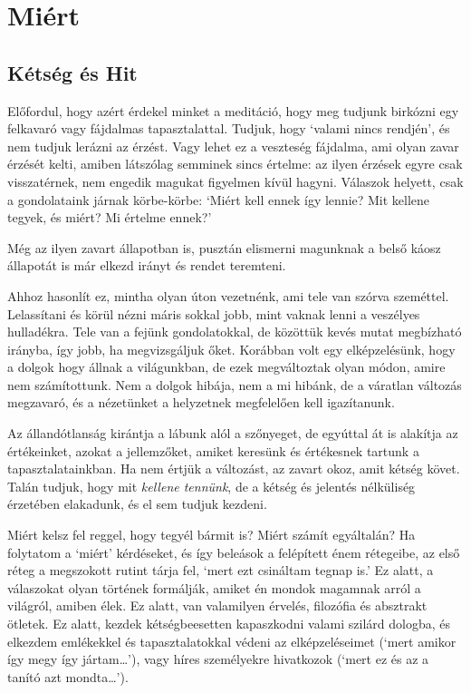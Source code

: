 \chapter{Miért}

\section{Kétség és Hit}


\noindent Előfordul, hogy azért érdekel minket a meditáció, hogy meg
tudjunk birkózni egy felkavaró vagy fájdalmas tapasztalattal. Tudjuk,
hogy `valami nincs rendjén', és nem tudjuk lerázni az érzést. Vagy lehet
ez a veszteség fájdalma, ami olyan zavar érzését kelti, amiben látszólag
semminek sincs értelme: az ilyen érzések egyre csak visszatérnek, nem
engedik magukat figyelmen kívül hagyni. Válaszok helyett, csak a
gondolataink járnak körbe-körbe: `Miért kell ennek így lennie? Mit
kellene tegyek, és miért? Mi értelme ennek?'

Még az ilyen zavart állapotban is, pusztán elismerni magunknak a belső
káosz állapotát is már elkezd irányt és rendet teremteni.

Ahhoz hasonlít ez, mintha olyan úton vezetnénk, ami tele van szórva
szeméttel. Lelassítani és körül nézni máris sokkal jobb, mint vaknak
lenni a veszélyes hulladékra. Tele van a fejünk gondolatokkal, de
közöttük kevés mutat megbízható irányba, így jobb, ha megvizsgáljuk
őket. Korábban volt egy elképzelésünk, hogy a dolgok hogy állnak a
világunkban, de ezek megváltoztak olyan módon, amire nem számítottunk.
Nem a dolgok hibája, nem a mi hibánk, de a váratlan változás megzavaró,
és a nézetünket a helyzetnek megfelelően kell igazítanunk.

Az állandótlanság kirántja a lábunk alól a szőnyeget, de egyúttal át is
alakítja az értékeinket, azokat a jellemzőket, amiket keresünk és
értékesnek tartunk a tapasztalatainkban. Ha nem értjük a változást, az
zavart okoz, amit kétség követ. Talán tudjuk, hogy mit \emph{kellene
tennünk}, de a kétség és jelentés nélküliség érzetében elakadunk, és el
sem tudjuk kezdeni.


Miért kelsz fel reggel, hogy tegyél bármit is? Miért számít egyáltalán?
Ha folytatom a `miért' kérdéseket, és így beleások a felépített énem
rétegeibe, az első réteg a megszokott rutint tárja fel, `mert ezt
csináltam tegnap is.' Ez alatt, a válaszokat olyan történek formálják,
amiket én mondok magamnak arról a világról, amiben élek. Ez alatt, van
valamilyen érvelés, filozófia és absztrakt ötletek. Ez alatt, kezdek
kétségbeesetten kapaszkodni valami szilárd dologba, és elkezdem
emlékekkel és tapasztalatokkal védeni az elképzeléseimet (`mert amikor
így megy így jártam\ldots{}'), vagy híres személyekre hivatkozok (`mert
ez és az a tanító azt mondta\ldots{}').

